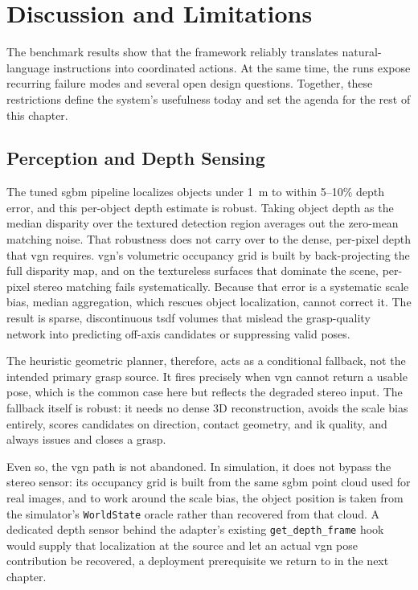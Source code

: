 \chapter{Discussion and Limitations}\label{discussion}
The benchmark results show that the framework reliably translates natural-language instructions into coordinated actions. At the same time, the runs expose recurring failure modes and several open design questions. Together, these restrictions define the system’s usefulness today and set the agenda for the rest of this chapter.

\section{Perception and Depth Sensing}\label{sec:perception-depth}
The tuned \gls{sgbm} pipeline localizes objects under 1~m to within 5–10\% depth error, and this per-object depth estimate is robust. Taking object depth as the median disparity over the textured detection region averages out the zero-mean matching noise. That robustness does not carry over to the dense, per-pixel depth that \gls{vgn} requires. \gls{vgn}'s volumetric occupancy grid is built by back-projecting the full disparity map, and on the textureless surfaces that dominate the scene, per-pixel stereo matching fails systematically. Because that error is a systematic scale bias, median aggregation, which rescues object localization, cannot correct it. The result is sparse, discontinuous \gls{tsdf} volumes that mislead the grasp-quality network into predicting off-axis candidates or suppressing valid poses.

The heuristic geometric planner, therefore, acts as a conditional fallback, not the intended primary grasp source. It fires precisely when \gls{vgn} cannot return a usable pose, which is the common case here but reflects the degraded stereo input. The fallback itself is robust: it needs no dense 3D reconstruction, avoids the scale bias entirely, scores candidates on direction, contact geometry, and \gls{ik} quality, and always issues and closes a grasp.

Even so, the \gls{vgn} path is not abandoned. In simulation, it does not bypass the stereo sensor: its occupancy grid is built from the same \gls{sgbm} point cloud used for real images, and to work around the scale bias, the object position is taken from the simulator’s \texttt{WorldState} oracle rather than recovered from that cloud. A dedicated depth sensor behind the adapter’s existing \texttt{get\_depth\_frame} hook would supply that localization at the source and let an actual \gls{vgn} pose contribution be recovered, a deployment prerequisite we return to in the next chapter.

